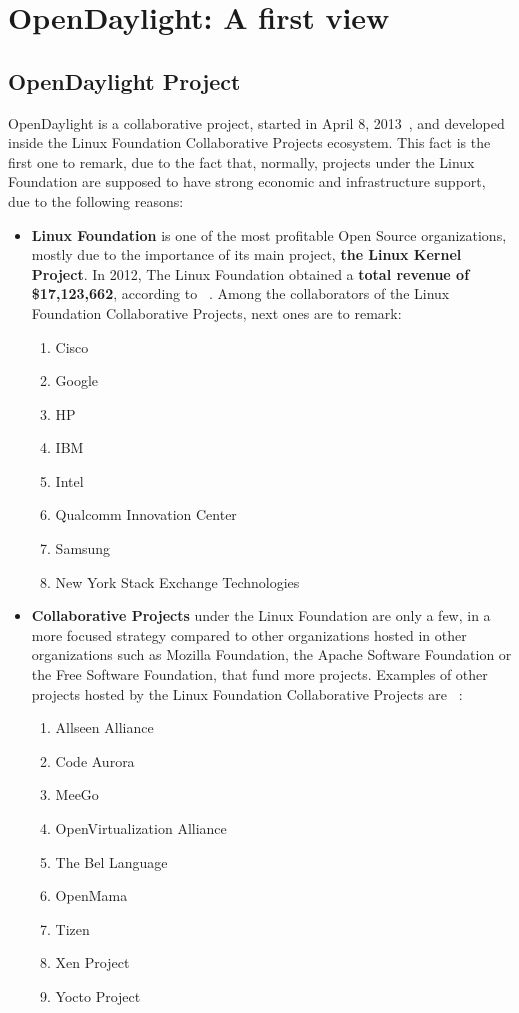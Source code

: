 \documentclass[a4paper, 12pt]{book}
\begin{document}
\chapter{OpenDaylight: A first view}
\label{chap:odlfirstview}

\section{OpenDaylight Project}
\label{sec:odlintro}

OpenDaylight is a collaborative project, started in April 8, 2013~\cite{OpenDaylightAnnouncement}, and developed inside the Linux Foundation Collaborative Projects ecosystem. This fact is the first one to remark, due to the fact that, normally, projects under the Linux Foundation are supposed to have strong economic and infrastructure support, due to the following reasons:
\begin{itemize}
 \item \textbf{Linux Foundation} is one of the most profitable Open Source organizations, mostly due to the importance of its main project, \textbf{the Linux Kernel Project}. In 2012, The Linux Foundation obtained a \textbf{total revenue of \$17,123,662}, according to ~\cite{2012LinuxFoundationReport}. Among the collaborators of the Linux Foundation Collaborative Projects, next ones are to remark: ~\cite{LinuxFoundationCollaborativeProjects}
 \begin{enumerate}\itemsep0pt
  \item Cisco
  \item Google
  \item HP
  \item IBM
  \item Intel
  \item Qualcomm Innovation Center
  \item Samsung
  \item New York Stack Exchange Technologies
 \end{enumerate}
 \item \textbf{Collaborative Projects} under the Linux Foundation are only a few, in a more focused strategy compared to other organizations hosted in other organizations such as Mozilla Foundation, the Apache Software Foundation or the Free Software Foundation, that fund more projects. Examples of other projects hosted by the Linux Foundation Collaborative Projects are ~\cite{LinuxFoundationCollaborativeProjects}:
 \begin{enumerate}\itemsep0pt
  \item Allseen Alliance
  \item Code Aurora
  \item MeeGo
  \item OpenVirtualization Alliance
  \item The Bel Language
  \item OpenMama
  \item Tizen
  \item Xen Project
  \item Yocto Project
 \end{enumerate}
\end{itemize}
\end{document}
